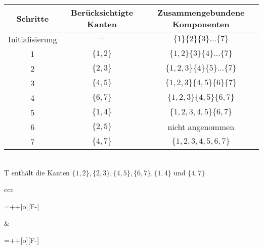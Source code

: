 \documentclass[a4paper,twoside,DIV15,BCOR12mm]{scrbook}
\begin{document}
\begin{tabular}{ccc}
	Schritte	&	Berücksichtigte Kanten	&	Zusammengebundene Komponenten	\\
	\hline
	Initialisierung			&	$-$												&	$\{1\} \{2\} \{3\} \dots \{7\}$ \\
	1										&	$\{1,2\}$									&	$\{1,2\} \{3\} \{4\} \dots \{7\}$ \\
	2										& $\{2,3\}$									&	$\{1,2,3\} \{4\} \{5\} \dots \{7\}$ \\
	3										&	$\{4,5\}$									&	$\{1,2,3\} \{4,5\} \{6\} \{7\}$ \\
	4										&	$\{6,7\}$									&	$\{1,2,3\} \{4,5\} \{6,7\}$ \\
	5										& $\{1,4\}$									&	$\{1,2,3,4,5\} \{6,7\}$ \\
	6										&	$\{2,5\}$									&	nicht angenommen \\
	7										&	$\{4,7\}$									&	$\{1,2,3,4,5,6,7\}$ \\
\end{tabular} \\
	
T enthält die Kanten $\{1,2\},\{2,3\},\{4,5\},\{6,7\},\{1,4\}$ und $\{4,7\}$ \\

\begin{tabular}[t]{ccc}
    \begin{xy}
        \entrymodifiers={++[o][F-]}
    \end{xy} &        
    \begin{xy}
        \entrymodifiers={++[o][F-]}
    \end{xy} \\
	\end{tabular}
\end{document}

